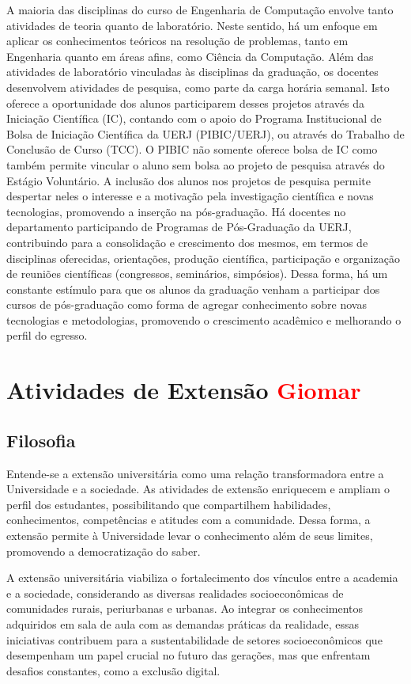 A maioria das disciplinas do curso de Engenharia de Computação envolve tanto atividades de teoria quanto de laboratório. Neste sentido, há um enfoque em aplicar os conhecimentos teóricos na resolução de problemas, tanto em Engenharia quanto em áreas afins, como Ciência da Computação. Além das atividades de laboratório vinculadas às disciplinas da graduação, os docentes desenvolvem atividades de pesquisa, como parte da carga horária semanal. Isto oferece a oportunidade dos alunos participarem desses projetos através da Iniciação Científica (IC), contando com o apoio do Programa Institucional de Bolsa de Iniciação Científica da UERJ (PIBIC/UERJ), ou através do Trabalho de Conclusão de Curso (TCC). O PIBIC não somente oferece bolsa de IC como também permite vincular o aluno sem bolsa ao projeto de pesquisa através do Estágio Voluntário. A inclusão dos alunos nos projetos de pesquisa permite despertar neles o interesse e a motivação pela investigação científica e novas tecnologias, promovendo a inserção na pós-graduação. Há docentes no departamento participando de Programas de Pós-Graduação da UERJ, contribuindo para a consolidação e crescimento dos mesmos, em termos de disciplinas oferecidas, orientações, produção científica, participação e organização de reuniões científicas (congressos, seminários, simpósios). Dessa forma, há um constante estímulo para que os alunos da graduação venham a participar dos cursos de pós-graduação como forma de agregar conhecimento sobre novas tecnologias e metodologias, promovendo o crescimento acadêmico e melhorando o perfil do egresso.

\section{Atividades de Extensão \textcolor{red}{Giomar}}

\subsection{Filosofia}
Entende-se a extensão universitária como uma relação transformadora entre a Universidade e a sociedade. As atividades de extensão enriquecem e ampliam o perfil dos estudantes, possibilitando que compartilhem habilidades, conhecimentos, competências e atitudes com a comunidade. Dessa forma, a extensão permite à Universidade levar o conhecimento além de seus limites, promovendo a democratização do saber. 

A extensão universitária viabiliza o fortalecimento dos vínculos entre a academia e a sociedade, considerando as diversas realidades socioeconômicas de comunidades rurais, periurbanas e urbanas. Ao integrar os conhecimentos adquiridos em sala de aula com as demandas práticas da realidade, essas iniciativas contribuem para a sustentabilidade de setores socioeconômicos que desempenham um papel crucial no futuro das gerações, mas que enfrentam desafios constantes, como a exclusão digital.

